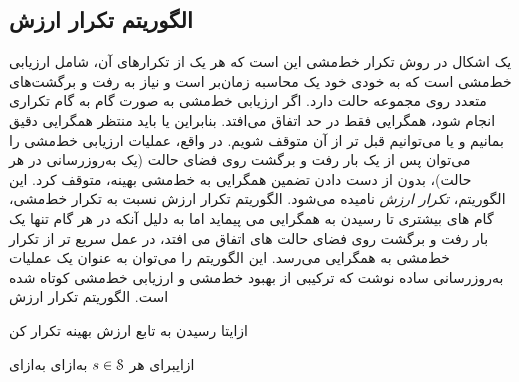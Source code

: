 \subsection{الگوریتم تکرار ارزش}
یک اشکال در روش تکرار خط‌مشی این است که هر یک از تکرارهای آن، شامل ارزیابی خط‌مشی است که
به خودی خود یک محاسبه زمان‌بر است و نیاز به رفت و برگشت‌های متعدد روی مجموعه حالت دارد. اگر
ارزیابی خط‌مشی به صورت گام به گام تکراری انجام شود، همگرایی فقط در حد اتفاق می‌افتد. بنابراین یا باید منتظر همگرایی دقیق بمانیم و یا می‌توانیم قبل تر از آن متوقف شویم. 
در واقع، عملیات ارزیابی خط‌مشی را می‌توان پس از یک بار رفت و برگشت روی فضای حالت (یک به‌روزرسانی در هر حالت)،  بدون از دست دادن تضمین همگرایی به خط‌مشی بهینه، متوقف کرد. 
این الگوریتم،
\textit{تکرار ارزش}
 نامیده می‌شود. الگوریتم تکرار ارزش نسبت به تکرار خط‌مشی، گام های بیشتری تا رسیدن به همگرایی می پیماید اما به دلیل آنکه در هر گام تنها یک بار رفت و برگشت روی فضای حالت های اتفاق می افتد، در عمل سریع تر از تکرار خط‌مشی به همگرایی می‌رسد. این الگوریتم
را می‌توان به عنوان یک عملیات به‌روزرسانی ساده نوشت که ترکیبی از بهبود خط‌مشی و ارزیابی خط‌مشی کوتاه شده است.
{الگوریتم تکرار ارزش}

‌ازای{تا رسیدن به تابع ارزش بهینه تکرار کن}

‌ازای{برای هر $s \in \EuScript{S}$}
‌به‌ازای
‌به‌ازای
